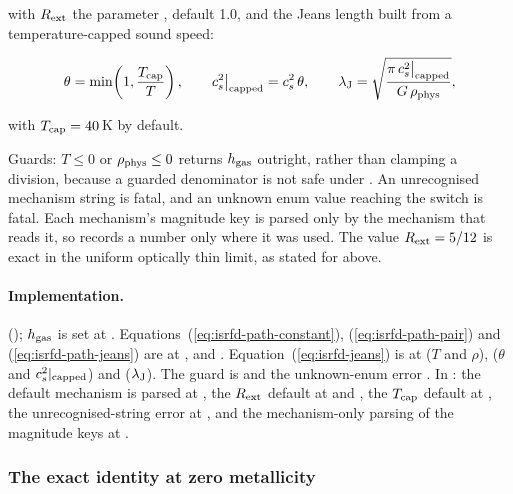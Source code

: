 with
$R_{\rm ext}$ the parameter ,
default 1.0, and the Jeans length built
from a temperature-capped sound speed:

\begin{equation}
  \theta = \min\!\left(1, \frac{T_{\rm cap}}{T}\right),
  \qquad
  c_s^2\big|_{\rm capped} = c_s^2\, \theta,
  \qquad
  \lambda_{\rm J} = \sqrt{\frac{\pi\, c_s^2\big|_{\rm capped}}{G\, \rho_{\rm phys}}},
  \label{eq:isrfd-jeans}
\end{equation}

with
$T_{\rm cap} = 40$\,K by default.

Guards: $T \le 0$ or $\rho_{\rm phys} \le 0$ returns $h_{\rm gas}$ outright,
rather than clamping a division, because a guarded denominator is not safe under
. An unrecognised
mechanism string is fatal, and an
unknown enum value reaching the switch is fatal. Each mechanism's magnitude key
is parsed
only by the mechanism that reads it, so  records a
number only where it was used. The
value $R_{\rm ext} = 5/12$ is exact in the uniform optically thin limit, as
stated for  above.

\paragraph{Implementation.} 
(); $h_{\rm gas}$ is set at
. Equations~(\ref{eq:isrfd-path-constant}),
(\ref{eq:isrfd-path-pair}) and (\ref{eq:isrfd-path-jeans}) are at
,  and .
Equation~(\ref{eq:isrfd-jeans}) is at  ($T$
and $\rho$),  ($\theta$ and $c_s^2|_{\rm capped}$) and
 ($\lambda_{\rm J}$). The guard is 
and the unknown-enum error . In
: the default mechanism is parsed at
, the $R_{\rm ext}$ default at  and ,
the $T_{\rm cap}$ default at , the unrecognised-string error at
, and the mechanism-only parsing of the magnitude keys at
.

\subsubsection{The exact identity at zero metallicity}
\label{sec:isrfd-zero-Z}

